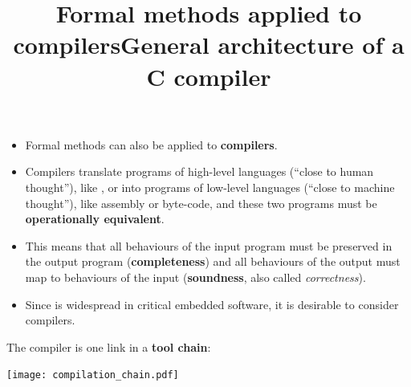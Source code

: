 \documentclass[wide]{slides}
\begin{document}
\begin{slide}
  \title{Formal methods applied to compilers}

  \begin{itemize}

    \item Formal methods can also be applied to \textbf{compilers}.

    \item Compilers translate programs of high\hyp{}level languages
      (``close to human thought''), like \Clang, \Ada or \OCaml into
      programs of low\hyp{}level languages (``close to machine
      thought''), like assembly or byte\hyp{}code, and these two
      programs must be \textbf{operationally equivalent}.

    \item This means that all behaviours of the input program must be
      preserved in the output program (\textbf{completeness}) and all
      behaviours of the output must map to behaviours of the input
      (\textbf{soundness}, also called \emph{correctness}).

    \item Since \Clang is widespread in critical embedded software, it
      is desirable to consider \Clang compilers.

  \end{itemize}

\end{slide}

\begin{slide}
  \title{General architecture of a C compiler}

  The compiler is one link in a \textbf{tool chain}:
  \begin{center}
    \texttt{[image: compilation\_chain.pdf]}
  \end{center}

\end{slide}
\end{document}
